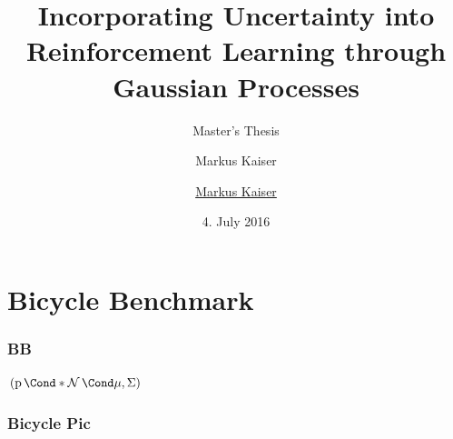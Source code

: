




\title{Incorporating Uncertainty into Reinforcement Learning through Gaussian Processes}
\author{Markus Kaiser}
\subtitle{Master's Thesis}
\author{\href{mailto:markus.kaiser@in.tum.de}{Markus Kaiser}}
\date{4. July 2016}



\begin{frame}[plain]
    \titlepage
\end{frame}

\section{Bicycle Benchmark}
\begin{frame}
    \frametitle{BB}

    $\Bicycle{\Prob*{\Gaussian{\mu, \Sigma}}}$
\end{frame}

\begin{frame}
    \frametitle{Bicycle Pic}

    \begin{columns}
        \begin{column}[b]{0.5\textwidth}
            \centering
            
        \end{column}
        \begin{column}[b]{0.5\textwidth}
            \centering
            
        \end{column}
    \end{columns}
\end{frame}

